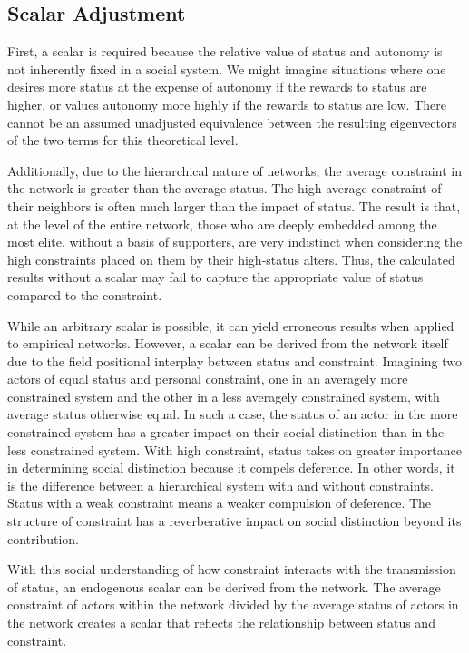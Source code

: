 \subsection{Scalar Adjustment}
First, a scalar is required because the relative value of status and autonomy is not inherently fixed in a social system. We might imagine situations where one desires more status at the expense of autonomy if the rewards to status are higher, or values autonomy more highly if the rewards to status are low. There cannot be an assumed unadjusted equivalence between the resulting eigenvectors of the two terms for this theoretical level.

Additionally, due to the hierarchical nature of networks, the average constraint in the network is greater than the average status. The high average constraint of their neighbors is often much larger than the impact of status. The result is that, at the level of the entire network, those who are deeply embedded among the most elite, without a basis of supporters, are very indistinct when considering the high constraints placed on them by their high-status alters. Thus, the calculated results without a scalar may fail to capture the appropriate value of status compared to the constraint.

While an arbitrary scalar is possible, it can yield erroneous results when applied to empirical networks. However, a scalar can be derived from the network itself due to the field positional interplay between status and constraint. Imagining two actors of equal status and personal constraint, one in an averagely more constrained system and the other in a less averagely constrained system, with average status otherwise equal. In such a case, the status of an actor in the more constrained system has a greater impact on their social distinction than in the less constrained system. With high constraint, status takes on greater importance in determining social distinction because it compels deference. In other words, it is the difference between a hierarchical system with and without constraints. Status with a weak constraint means a weaker compulsion of deference. The structure of constraint has a reverberative impact on social distinction beyond its contribution.

With this social understanding of how constraint interacts with the transmission of status, an endogenous scalar can be derived from the network. The average constraint of actors within the network divided by the average status of actors in the network creates a scalar that reflects the relationship between status and constraint. 

